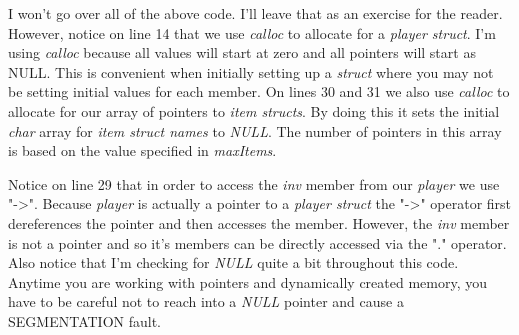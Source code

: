 \documentclass[../main.tex]{subfiles}
\begin{document}
	
	
	I won't go over all of the above code.  I'll leave that as an exercise for the reader.  However, notice on line 14 that we use \textit{calloc} to allocate for a \textit{player struct}.  I'm using \textit{calloc} because all values will start at zero and all pointers will start as NULL.  This is convenient when initially setting up a \textit{struct} where you may not be setting initial values for each member.  On lines 30 and 31 we also use \textit{calloc} to allocate for our array of pointers to \textit{item structs}.  By doing this it sets the initial \textit{char} array for \textit{item struct names} to \textit{NULL}.  The number of pointers in this array is based on the value specified in \textit{maxItems}.
	
	Notice on line 29 that in order to access the \textit{inv} member from our \textit{player} we use "->".  Because \textit{player} is actually a pointer to a \textit{player struct} the "->" operator first dereferences the pointer and then accesses the member.  However, the \textit{inv} member is not a pointer and so it's members can be directly accessed via the "." operator.  Also notice that I'm checking for \textit{NULL} quite a bit throughout this code.  Anytime you are working with pointers and dynamically created memory, you have to be careful not to reach into a \textit{NULL} pointer and cause a SEGMENTATION fault.\\
	
	 
	
	
	
		 
	
\end{document}

